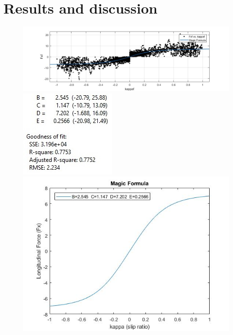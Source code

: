 \section{Results and discussion}

\begin{figure}
	\centering
		\includegraphics[scale=0.2]{figure/MagicFormulaFrontBags}
		\includegraphics[scale=0.5]{figure/MagicFormulaFrontBagsFitnumbers}
		\includegraphics[scale=0.2]{figure/MagicFormulaFrontBagsPic}
		\label{fig:mffront}
\end{figure}
